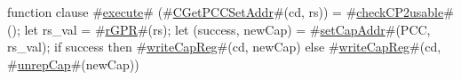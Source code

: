 function clause #\hyperref[zexecute]{execute}# (#\hyperref[zCGetPCCSetAddr]{CGetPCCSetAddr}#(cd, rs)) =
{
  #\hyperref[zcheckCP2usable]{checkCP2usable}#();
  let rs_val = #\hyperref[zrGPR]{rGPR}#(rs);
  let (success, newCap) = #\hyperref[zsetCapAddr]{setCapAddr}#(PCC, rs_val);
  if success then
      #\hyperref[zwriteCapReg]{writeCapReg}#(cd, newCap)
  else
      #\hyperref[zwriteCapReg]{writeCapReg}#(cd, #\hyperref[zunrepCap]{unrepCap}#(newCap))
}
